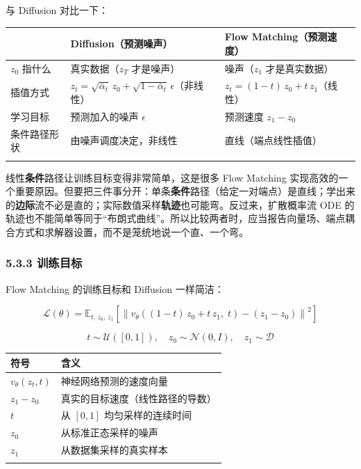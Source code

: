 \documentclass[
  chinese,
]{ctexart}
\begin{document}
与 Diffusion 对比一下：

\begin{center}
\begin{tabular}{@{}>{\raggedright\arraybackslash}p{} >{\raggedright\arraybackslash}p{} >{\raggedright\arraybackslash}p{}@{}}
\toprule\noalign{}
 & Diffusion（预测噪声） & Flow Matching（预测速度） \\
\midrule\noalign{}
\(z_0\) 指什么 & 真实数据（\(z_T\) 才是噪声） & 噪声（\(z_1\) 才是真实数据） \\
插值方式 & \(z_t = \sqrt{\bar{\alpha}_t}\, z_0 + \sqrt{1-\bar{\alpha}_t}\, \epsilon\)（非线性） & \(z_t = (1-t)\, z_0 + t\, z_1\)（线性） \\
学习目标 & 预测加入的噪声 \(\epsilon\) & 预测速度 \(z_1 - z_0\) \\
条件路径形状 & 由噪声调度决定，非线性 & 直线（端点线性插值） \\
\bottomrule\noalign{}
\end{tabular}
\end{center}

线性\textbf{条件}路径让训练目标变得非常简单，这是很多 Flow Matching
实现高效的一个重要原因。但要把三件事分开：单条\textbf{条件}路径（给定一对端点）是直线；学出来的\textbf{边际}流不必是直的；实际数值采样\textbf{轨迹}也可能弯。反过来，扩散概率流
ODE
的轨迹也不能简单等同于``布朗式曲线''。所以比较两者时，应当报告向量场、端点耦合方式和求解器设置，而不是笼统地说一个直、一个弯。

\subsubsection{5.3.3 训练目标}\label{ux8badux7ec3ux76eeux6807}

Flow Matching 的训练目标和 Diffusion 一样简洁：

\[
\mathcal{L}(\theta) = \mathbb{E}_{t,\, z_0,\, z_1}\left[\left\| v_\theta\!\left((1-t)\, z_0 + t\, z_1,\; t\right) - (z_1 - z_0)\right\|^2\right]
\]

\[
t \sim \mathcal{U}([0, 1]), \quad z_0 \sim \mathcal{N}(0, I), \quad z_1 \sim \mathcal{D}
\]

\begin{center}
\begin{tabular}{@{}>{\raggedright\arraybackslash}p{} >{\raggedright\arraybackslash}p{}@{}}
\toprule\noalign{}
符号 & 含义 \\
\midrule\noalign{}
\(v_\theta(z_t, t)\) & 神经网络预测的速度向量 \\
\(z_1 - z_0\) & 真实的目标速度（线性路径的导数） \\
\(t\) & 从 \([0, 1]\) 均匀采样的连续时间 \\
\(z_0\) & 从标准正态采样的噪声 \\
\(z_1\) & 从数据集采样的真实样本 \\
\bottomrule\noalign{}
\end{tabular}
\end{center}
\end{document}

